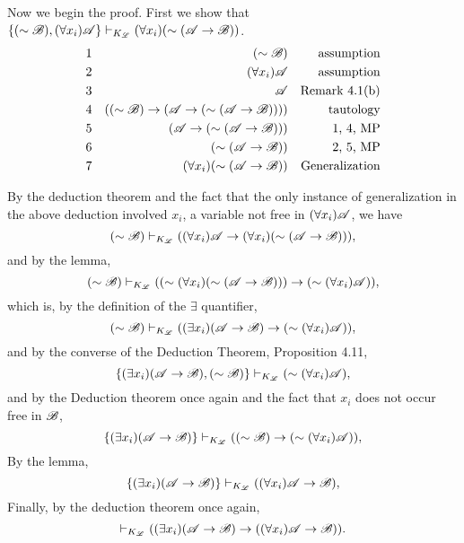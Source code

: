 \begin{enumerate}
\begin{enumerate}
          Now we begin the proof. First we show that \(\{(\sim\mathscr{B}), (\forall x_i)\mathscr{A}\} \vdash_{K_{\mathscr{L}}} (\forall x_i)(\sim(\mathscr{A} \rightarrow \mathscr{B}))\).
          \begin{align*}
            \text{1}&&
            (\sim\mathscr{B})&&
            \text{assumption}\\
            \text{2}&&
            (\forall x_i)\mathscr{A}&&
            \text{assumption}\\
            \text{3}&&
            \mathscr{A}&&
            \text{Remark 4.1(b)}\\
            \text{4}&&
            ((\sim\mathscr{B}) \rightarrow (\mathscr{A} \rightarrow (\sim(\mathscr{A} \rightarrow \mathscr{B}))))&&
            \text{tautology}\\
            \text{5}&&
            (\mathscr{A} \rightarrow (\sim(\mathscr{A} \rightarrow \mathscr{B})))&&
            \text{1, 4, MP}\\
            \text{6}&&
            (\sim(\mathscr{A} \rightarrow \mathscr{B}))&&
            \text{2, 5, MP}\\
            \text{7}&&
            (\forall x_i)(\sim(\mathscr{A} \rightarrow \mathscr{B}))&&
            \text{Generalization}
          \end{align*}
          
          By the deduction theorem and the fact that the only instance of generalization in the above deduction involved \(x_i\), a variable not free in \((\forall x_i)\mathscr{A}\), we have
          \[(\sim\mathscr{B}) \vdash_{K_{\mathscr{L}}} ((\forall x_i) \mathscr{A} \rightarrow (\forall x_i)(\sim(\mathscr{A} \rightarrow \mathscr{B}))),\]
          and by the lemma,
          \[(\sim\mathscr{B}) \vdash_{K_{\mathscr{L}}} ((\sim(\forall x_i)(\sim(\mathscr{A} \rightarrow \mathscr{B}))) \rightarrow (\sim(\forall x_i) \mathscr{A})),\]
          which is, by the definition of the \(\exists\) quantifier,
          \[(\sim\mathscr{B}) \vdash_{K_{\mathscr{L}}} ((\exists x_i)(\mathscr{A} \rightarrow \mathscr{B}) \rightarrow (\sim(\forall x_i) \mathscr{A})),\]
          and by the converse of the Deduction Theorem, Proposition 4.11,
          \[\{(\exists x_i)(\mathscr{A} \rightarrow \mathscr{B}), (\sim\mathscr{B})\} \vdash_{K_{\mathscr{L}}} (\sim(\forall x_i) \mathscr{A}),\]
          and by the Deduction theorem once again and the fact that \(x_i\) does not occur free in \(\mathscr{B}\),
          \[\{(\exists x_i)(\mathscr{A} \rightarrow \mathscr{B})\} \vdash_{K_{\mathscr{L}}} ((\sim\mathscr{B}) \rightarrow (\sim(\forall x_i) \mathscr{A})),\]
          By the lemma,
          \[\{(\exists x_i)(\mathscr{A} \rightarrow \mathscr{B})\} \vdash_{K_{\mathscr{L}}} ((\forall x_i) \mathscr{A} \rightarrow \mathscr{B}),\]
          Finally, by the deduction theorem once again,
          \[\vdash_{K_{\mathscr{L}}} ((\exists x_i)(\mathscr{A} \rightarrow \mathscr{B}) \rightarrow ((\forall x_i) \mathscr{A} \rightarrow \mathscr{B})).\]


\end{enumerate}
\end{enumerate}

